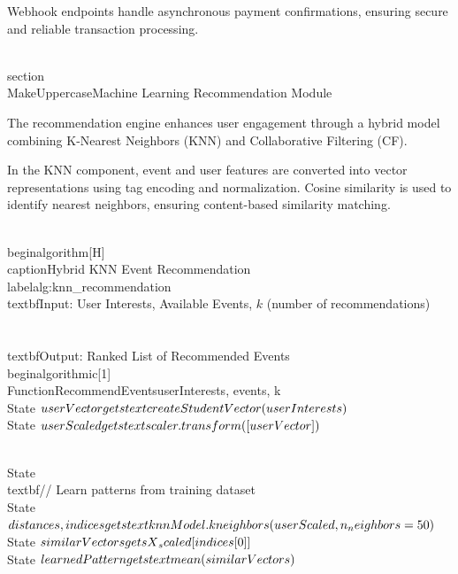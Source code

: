 Webhook endpoints handle asynchronous payment confirmations, ensuring secure and reliable transaction processing.

\\section{\\MakeUppercase{Machine Learning Recommendation Module}}

The recommendation engine enhances user engagement through a hybrid model combining K-Nearest Neighbors (KNN) and Collaborative Filtering (CF).

In the KNN component, event and user features are converted into vector representations using tag encoding and normalization. Cosine similarity is used to identify nearest neighbors, ensuring content-based similarity matching.

\\begin{algorithm}[H]
\\caption{Hybrid KNN Event Recommendation}
\\label{alg:knn_recommendation}
\\textbf{Input:} User Interests, Available Events, $k$ (number of recommendations)\\\\
\\textbf{Output:} Ranked List of Recommended Events
\\begin{algorithmic}[1]
\\Function{RecommendEvents}{userInterests, events, k}
    \\State $userVector \\gets \\text{createStudentVector}(userInterests)$
    \\State $userScaled \\gets \\text{scaler.transform}([userVector])$
    
    \\State \\textbf{// Learn patterns from training dataset}
    \\State $distances, indices \\gets \\text{knnModel.kneighbors}(userScaled, n\\_neighbors=50)$
    \\State $similarVectors \\gets X\\_scaled[indices[0]]$
    \\State $learnedPattern \\gets \\text{mean}(similarVectors)$
    
